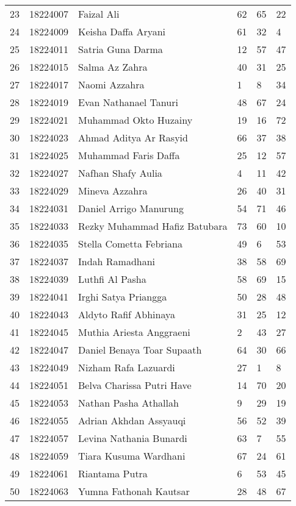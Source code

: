 \documentclass[
  letterpaper,
  DIV=11,
  numbers=noendperiod]{scrreprt}
\begin{document}
\begin{longtable}[]{@{}llllll@{}}
23 & 18224007 & Faizal Ali & 62 & 65 & 22 \\
24 & 18224009 & Keisha Daffa Aryani & 61 & 32 & 4 \\
25 & 18224011 & Satria Guna Darma & 12 & 57 & 47 \\
26 & 18224015 & Salma Az Zahra & 40 & 31 & 25 \\
27 & 18224017 & Naomi Azzahra & 1 & 8 & 34 \\
28 & 18224019 & Evan Nathanael Tanuri & 48 & 67 & 24 \\
29 & 18224021 & Muhammad Okto Huzainy & 19 & 16 & 72 \\
30 & 18224023 & Ahmad Aditya Ar Rasyid & 66 & 37 & 38 \\
31 & 18224025 & Muhammad Faris Daffa & 25 & 12 & 57 \\
32 & 18224027 & Nafhan Shafy Aulia & 4 & 11 & 42 \\
33 & 18224029 & Mineva Azzahra & 26 & 40 & 31 \\
34 & 18224031 & Daniel Arrigo Manurung & 54 & 71 & 46 \\
35 & 18224033 & Rezky Muhammad Hafiz Batubara & 73 & 60 & 10 \\
36 & 18224035 & Stella Cometta Febriana & 49 & 6 & 53 \\
37 & 18224037 & Indah Ramadhani & 38 & 58 & 69 \\
38 & 18224039 & Luthfi Al Pasha & 58 & 69 & 15 \\
39 & 18224041 & Irghi Satya Priangga & 50 & 28 & 48 \\
40 & 18224043 & Aldyto Rafif Abhinaya & 31 & 25 & 12 \\
41 & 18224045 & Muthia Ariesta Anggraeni & 2 & 43 & 27 \\
42 & 18224047 & Daniel Benaya Toar Supaath & 64 & 30 & 66 \\
43 & 18224049 & Nizham Rafa Lazuardi & 27 & 1 & 8 \\
44 & 18224051 & Belva Charissa Putri Have & 14 & 70 & 20 \\
45 & 18224053 & Nathan Pasha Athallah & 9 & 29 & 19 \\
46 & 18224055 & Adrian Akhdan Assyauqi & 56 & 52 & 39 \\
47 & 18224057 & Levina Nathania Bunardi & 63 & 7 & 55 \\
48 & 18224059 & Tiara Kusuma Wardhani & 67 & 24 & 61 \\
49 & 18224061 & Riantama Putra & 6 & 53 & 45 \\
50 & 18224063 & Yumna Fathonah Kautsar & 28 & 48 & 67 \\

\end{longtable}
\end{document}
